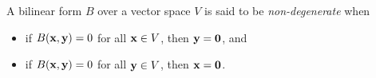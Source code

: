 \documentclass{article}
\begin{document}
A bilinear form $B$ over a vector space $V$ is said to be {\em non-degenerate} when
\begin{itemize}
\item if $B({{\bf x}},{{\bf y}}) = 0$ for all ${{\bf x}} \in V$, then ${{\bf y}} = {{\bf 0}}$, and
\item if $B({{\bf x}},{{\bf y}}) = 0$ for all ${{\bf y}} \in V$, then ${{\bf x}} = {{\bf 0}}$.
\end{itemize}
\end{document}
